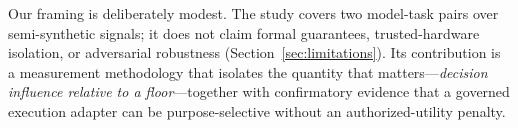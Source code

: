 Our framing is deliberately modest. The study covers two model-task pairs over
semi-synthetic signals; it does not claim formal guarantees, trusted-hardware
isolation, or adversarial robustness (Section~\ref{sec:limitations}). Its
contribution is a measurement methodology that isolates the quantity that
matters---\emph{decision influence relative to a floor}---together with
confirmatory evidence that a governed execution adapter can be purpose-selective
without an authorized-utility penalty.
